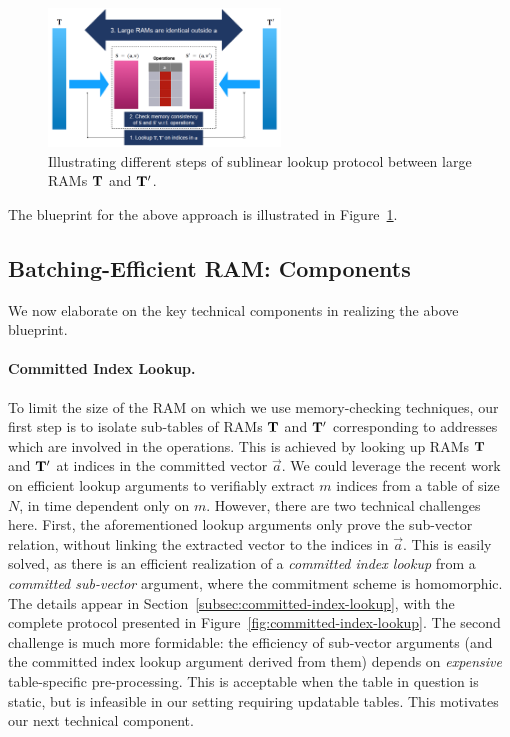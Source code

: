 \begin{figure}[htbp]
    \centering
    \includegraphics[width=0.55\textwidth]{RAM-Lookup}
    \caption{Illustrating different steps of sublinear lookup protocol between large RAMs $\mathbf{T}$ and $\mathbf{T}'$.}
    \label{fig:blueprint}
\end{figure}

The blueprint for the above approach is illustrated in Figure~\ref{fig:blueprint}.

\subsection{Batching-Efficient RAM: Components}\label{subsec:batching-efficient-ram-components}
We now elaborate on the key technical components in realizing the above blueprint.

\paragraph{\bf Committed Index Lookup.} To limit the size of the RAM on which we use memory-checking techniques,
our first step is to isolate sub-tables of RAMs $\mathbf{T}$ and
$\mathbf{T}'$ corresponding to addresses which are involved in the operations.
This is achieved by looking up RAMs $\mathbf{T}$ and
$\mathbf{T}'$ at indices in the committed vector $\vec{a}$. We could leverage the recent work on efficient lookup
arguments to verifiably extract $m$ indices from a table of size $N$, in time dependent only on $m$.
However, there are two technical challenges here. First, the aforementioned lookup arguments only prove the sub-vector
relation, without linking the extracted vector to the indices in $\vec{a}$. This is easily solved, as there
is an efficient realization of a {\em committed index lookup} from a {\em committed sub-vector} argument,
where the commitment scheme is homomorphic. The details appear in Section~\ref{subsec:committed-index-lookup},
with the complete protocol presented in Figure~\ref{fig:committed-index-lookup}. The second challenge is much more
formidable: the efficiency of sub-vector arguments (and the committed index lookup argument derived from them)
depends on {\em expensive} table-specific pre-processing. This is acceptable when the table in question is
static, but is infeasible in our setting requiring updatable tables. This motivates our next technical
component.

